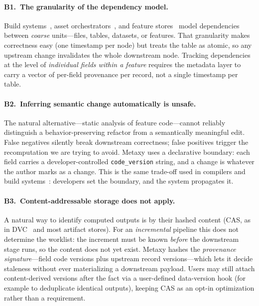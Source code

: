 \documentclass[sigconf]{acmart}
\begin{document}
\paragraph{B1.~The granularity of the dependency model.}
Build systems~\cite{mokhov2018build}, asset orchestrators~\cite{dagster}, and feature stores~\cite{feast} model dependencies between \emph{coarse} units---files, tables, datasets, or features.
That granularity makes correctness easy (one timestamp per node) but treats the table as atomic, so any upstream change invalidates the whole downstream node.
Tracking dependencies at the level of \emph{individual fields within a feature} requires the metadata layer to carry a vector of per-field provenance per record, not a single timestamp per table.

\paragraph{B2.~Inferring semantic change automatically is unsafe.}
The natural alternative---static analysis of feature code---cannot reliably distinguish a behavior-preserving refactor from a semantically meaningful edit.
False negatives silently break downstream correctness; false positives trigger the recomputation we are trying to avoid.
Metaxy uses a declarative boundary: each field carries a developer-controlled \texttt{code\_version} string, and a change is whatever the author marks as a change.
This is the same trade-off used in compilers and build systems~\cite{mokhov2018build}: developers set the boundary, and the system propagates it.

\paragraph{B3.~Content-addressable storage does not apply.}
A natural way to identify computed outputs is by their hashed content (CAS, as in DVC~\cite{dvc} and most artifact stores).
For an \emph{incremental} pipeline this does not determine the worklist: the increment must be known \emph{before} the downstream stage runs, so the content does not yet exist.
Metaxy hashes the \emph{provenance signature}---field code versions plus upstream record versions---which lets it decide staleness without ever materializing a downstream payload.
Users may still attach content-derived versions after the fact via a user-defined data-version hook (for example to deduplicate identical outputs), keeping CAS as an opt-in optimization rather than a requirement.
\end{document}
